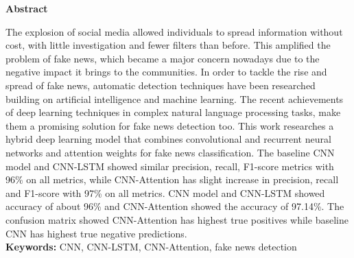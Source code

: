 \centerline{\large\textbf{Abstract}}

\vspace{1cm}

The explosion of social media allowed individuals to spread information without cost, with little investigation and fewer ﬁlters than before. This ampliﬁed the problem of fake news, which became a major concern nowadays due to the negative impact it brings to the communities. In order to tackle the rise and spread of fake news, automatic detection techniques have been researched building on artiﬁcial intelligence and machine learning. The recent achievements of deep learning techniques in complex natural language processing tasks, make them a promising solution for fake news detection too. This work researches a hybrid deep learning model that combines convolutional and recurrent neural networks and attention weights for fake news classiﬁcation. The baseline CNN model and CNN-LSTM showed similar precision, recall, F1-score metrics with 96\% on all metrics, while CNN-Attention has slight increase in precision, recall and F1-score with 97\% on all metrics. CNN model and CNN-LSTM showed accuracy of about 96\% and CNN-Attention showed the accuracy of 97.14\%. The confusion matrix showed CNN-Attention has highest true positives  while baseline CNN has highest true negative predictions. \\

\textbf{Keywords:}  CNN, CNN-LSTM, CNN-Attention, fake news detection

